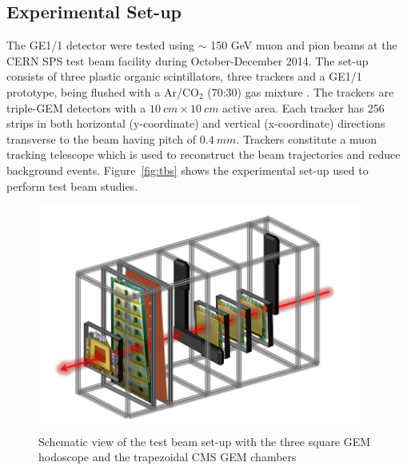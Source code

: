 \subsection{Experimental Set-up}
The GE1/1 detector were tested using $\sim$ 150 GeV muon and pion beams at the CERN SPS test beam facility during October-December 2014. 
The set-up consists of three plastic organic scintillators, three trackers and a GE1/1 prototype, being flushed with a Ar/CO$_{2}$ (70:30) gas mixture . The trackers are triple-GEM detectors with a $10~cm\times10~cm$ active area. Each tracker has 256 strips in both horizontal (y-coordinate) and vertical (x-coordinate) directions transverse to the beam having pitch of $0.4~mm$. Trackers constitute a muon tracking telescope which is used to reconstruct the beam trajectories and reduce background events. Figure~\ref{fig:tbs} shows the experimental set-up used to perform test beam studies.
\begin{figure}[!htbp]
    \begin{center}
        \includegraphics[width=0.95\textwidth]{figures/GEM/tbsetup.png}
        \caption{Schematic view of the test beam set-up with the three square GEM hodoscope and the trapezoidal CMS GEM chambers}
        \label{fig:tbsetup}
    \end{center}
\end{figure} 
